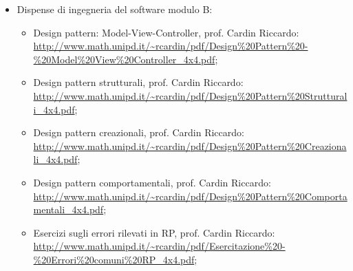 \begin{itemize}
\item Dispense di ingegneria del software modulo B:
\begin{itemize}
\item Design pattern: Model-View-Controller, prof. Cardin Riccardo:\\
\url{http://www.math.unipd.it/~rcardin/pdf/Design%20Pattern%20-%20Model%20View%20Controller_4x4.pdf};

\item Design pattern strutturali, prof. Cardin Riccardo:\\
\url{http://www.math.unipd.it/~rcardin/pdf/Design%20Pattern%20Strutturali_4x4.pdf};

\item Design pattern creazionali, prof. Cardin Riccardo:\\
\url{http://www.math.unipd.it/~rcardin/pdf/Design%20Pattern%20Creazionali_4x4.pdf};

\item Design pattern comportamentali, prof. Cardin Riccardo:\\
\url{http://www.math.unipd.it/~rcardin/pdf/Design%20Pattern%20Comportamentali_4x4.pdf};

\item Esercizi sugli errori rilevati in RP, prof. Cardin Riccardo:\\
\url{http://www.math.unipd.it/~rcardin/pdf/Esercitazione%20-%20Errori%20comuni%20RP_4x4.pdf};
\end{itemize}

\end{itemize}